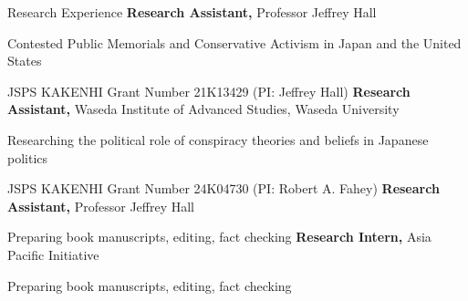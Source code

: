 \begin{rubric}{Research Experience}
\entry*[2025/05 -- 2026/03]%
\textbf{Research Assistant,} Professor Jeffrey Hall
\par \small Contested Public Memorials and Conservative Activism in Japan and the United States
\par \small JSPS KAKENHI Grant Number 21K13429 (PI: Jeffrey Hall)
%
%
%
\entry*[2023/09 -- 2025/03]%
\textbf{Research Assistant,} Waseda Institute of Advanced Studies, Waseda University
        \par \small Researching the political role of conspiracy theories and beliefs in Japanese politics
        \par \small JSPS KAKENHI Grant Number 24K04730 (PI: Robert A. Fahey)
\entry*[2020/09 -- 2020/10]%
\textbf{Research Assistant,} Professor Jeffrey Hall
\par \small Preparing book manuscripts, editing, fact checking
 \entry*[2020/04 -- 2020/06]%
 \textbf{Research Intern,} Asia Pacific Initiative
        \par \small  Preparing book manuscripts, editing, fact checking
 \end{rubric}
